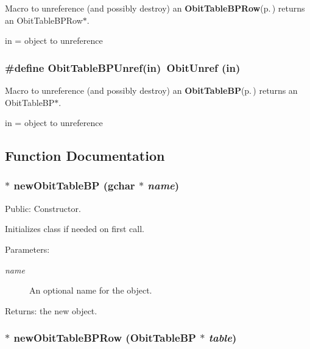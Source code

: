 Macro to unreference (and possibly destroy) an {\bf Obit\-Table\-BPRow}{\rm (p.\,\pageref{structObitTableBPRow})} returns an Obit\-Table\-BPRow$\ast$. 

in = object to unreference 
\subsubsection{\setlength{\rightskip}{0pt plus 5cm}\#define Obit\-Table\-BPUnref(in)\ Obit\-Unref (in)}\label{ObitTableBP_8h_a1}


Macro to unreference (and possibly destroy) an {\bf Obit\-Table\-BP}{\rm (p.\,\pageref{structObitTableBP})} returns an Obit\-Table\-BP$\ast$. 

in = object to unreference 

\subsection{Function Documentation}
\subsubsection{$\ast$ new\-Obit\-Table\-BP (gchar $\ast$ {\em name})}\label{ObitTableBP_8h_a11}


Public: Constructor. 

Initializes class if needed on first call. \begin{Desc}
\item[Parameters:]
\begin{description}
\item[{\em name}]An optional name for the object. \end{description}
\end{Desc}
\begin{Desc}
\item[Returns:]the new object. \end{Desc}
\subsubsection{$\ast$ new\-Obit\-Table\-BPRow ({\bf Obit\-Table\-BP} $\ast$ {\em table})}\label{ObitTableBP_8h_a8}


